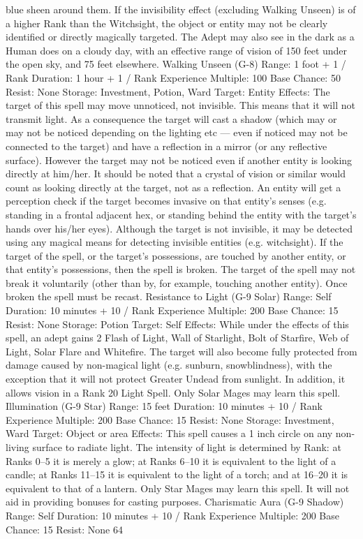 \documentclass[a4paper]{article}
\begin{document}
\begin{multicols}{3}
blue sheen around them. If the invisibility effect
(excluding Walking Unseen) is of a higher Rank
than the Witchsight, the object or entity may not be
clearly identified or directly magically targeted.
The Adept may also see in the dark as a Human
does on a cloudy day, with an effective range of
vision of 150 feet under the open sky, and 75 feet
elsewhere.
Walking Unseen (G-8)
Range: 1 foot + 1 / Rank
Duration: 1 hour + 1 / Rank
Experience Multiple: 100
Base Chance: 50%
Resist: None
Storage: Investment, Potion, Ward
Target: Entity
Effects: The target of this spell may move unnoticed, not invisible. This means that it will not
transmit light. As a consequence the target will cast
a shadow (which may or may not be noticed depending on the lighting etc — even if noticed may
not be connected to the target) and have a reflection in a mirror (or any reflective surface). However the target may not be noticed even if another
entity is looking directly at him/her. It should be
noted that a crystal of vision or similar would
count as looking directly at the target, not as a
reflection. An entity will get a perception check if
the target becomes invasive on that entity’s senses
(e.g. standing in a frontal adjacent hex, or standing
behind the entity with the target’s hands over
his/her eyes). Although the target is not invisible, it
may be detected using any magical means for
detecting invisible entities (e.g. witchsight).
If the target of the spell, or the target’s possessions,
are touched by another entity, or that entity’s possessions, then the spell is broken. The target of the
spell may not break it voluntarily (other than by,
for example, touching another entity). Once broken
the spell must be recast.
Resistance to Light (G-9 Solar)
Range: Self
Duration: 10 minutes + 10 / Rank
Experience Multiple: 200
Base Chance: 15%
Resist: None
Storage: Potion
Target: Self
Effects: While under the effects of this spell, an
adept gains 2%
Flash of Light, Wall of Starlight, Bolt of Starfire,
Web of Light, Solar Flare and Whitefire. The target
will also become fully protected from damage
caused by non-magical light (e.g. sunburn, snowblindness), with the exception that it will not protect Greater Undead from sunlight. In addition, it
allows vision in a Rank 20 Light Spell. Only Solar
Mages may learn this spell.
Illumination (G-9 Star)
Range: 15 feet
Duration: 10 minutes + 10 / Rank
Experience Multiple: 200
Base Chance: 15%
Resist: None
Storage: Investment, Ward
Target: Object or area
Effects: This spell causes a 1 inch circle on any
non-living surface to radiate light. The intensity of
light is determined by Rank: at Ranks 0–5 it is
merely a glow; at Ranks 6–10 it is equivalent to the
light of a candle; at Ranks 11–15 it is equivalent to
the light of a torch; and at 16–20 it is equivalent to
that of a lantern. Only Star Mages may learn this
spell. It will not aid in providing bonuses for casting purposes.
Charismatic Aura (G-9 Shadow)
Range: Self
Duration: 10 minutes + 10 / Rank
Experience Multiple: 200
Base Chance: 15%
Resist: None
64


\end{multicols}
\end{document}

